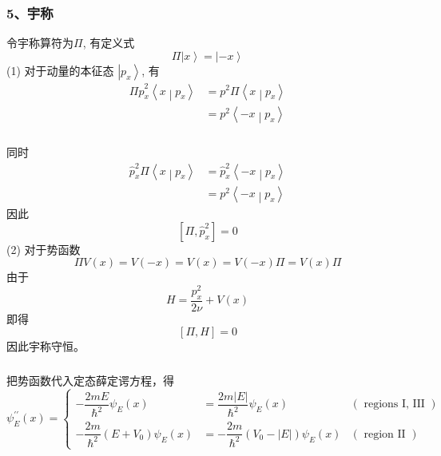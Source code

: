 \begin{frame}[label=current]
  \frametitle{5、宇称}
  \证 令宇称算符为$\Pi$, 有定义式
  \[ \Pi \left\vert x \right\rangle = \left\vert -x \right\rangle \]
  (1) 对于动量的本征态 $\left| p_x \right\rangle $, 有
  \[ \begin{aligned}
    \Pi \hat{p}_x^2 \left\langle x \middle| p_x \right\rangle
    &= p^2 \Pi \left\langle x \middle| p_x \right\rangle  \\ 
    &= p^2 \left\langle - x \middle| p_x \right\rangle 
  \end{aligned}\]
\end{frame} 

\begin{frame}[label=current]
  \frametitle{}
同时 
\[ \begin{aligned}
   \hat{p}_x^2 \Pi\left\langle x \middle| p_x \right\rangle
  &= \hat{p}_x^2 \left\langle -x \middle| p_x \right\rangle  \\ 
  &= p^2 \left\langle - x \middle| p_x \right\rangle 
\end{aligned}\]
因此 \[ [\Pi, \hat{p}_x^2 ] =0\]
(2) 对于势函数\[ \Pi V(x) = V(-x) = V(x) = V(-x)\Pi = V(x)\Pi\]
由于 \[ H = \frac{p^2_x}{2\nu} + V(x)\]
即得 \[ [\Pi, H ] =0\]
因此宇称守恒。
\end{frame} 

\begin{frame}[label=current]
  \frametitle{}
  \解  把势函数代入定态薛定谔方程，得
  \[ \psi_{E}^{\prime \prime}(x)=\left\{\begin{array}{lll}
    -\dfrac{2 m E}{\hbar^{2}} \psi_{E}(x) & =\dfrac{2 m|E|}{\hbar^{2}} \psi_{E}(x) & (\text { regions I, III }) \\
    -\dfrac{2 m}{\hbar^{2}}\left(E+V_{0}\right) \psi_{E}(x) & =-\dfrac{2 m}{\hbar^{2}}\left(V_{0}-|E|\right) \psi_{E}(x) & (\text { region II })
    \end{array}\right.\]
\end{frame} 

